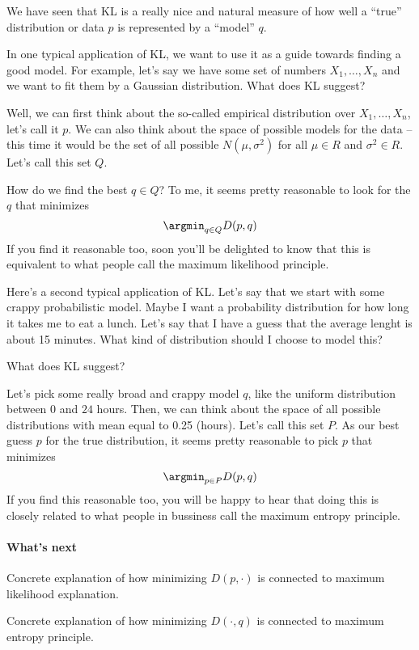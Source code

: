 \documentclass{article}
\begin{document}
We have seen that KL is a really nice and natural measure of how well a ``true'' distribution or data $p$ is represented by a ``model'' $q$. 

In one typical application of KL, we want to use it as a guide towards finding a good model. For example, let's say we have some set of numbers $X_1, \dots, X_n$ and we want to fit them by a Gaussian distribution. What does KL suggest? 

Well, we can first think about the so-called empirical distribution over $X_1, \dots, X_n$, let's call it $p$. 
We can also think about the space of possible models for the data -- this time it would be the set of all possible $N(\mu, \sigma^2)$ for all $\mu \in R$ and $\sigma^2 \in R$. Let's call this set $Q$. 

How do we find the best $q \in Q$? To me, it seems pretty reasonable to look for the $q$ that minimizes
\[
\argmin_{q\in Q} D(p, q)
\]
If you find it reasonable too, soon you'll be delighted to know that this is equivalent to what people call the maximum likelihood principle. 

Here's a second typical application of KL. Let's say that we start with some crappy probabilistic model. Maybe I want a probability distribution for how long it takes me to eat a lunch. Let's say that I have a guess that the average lenght is about 15 minutes. What kind of distribution should I choose to model this? 

What does KL suggest? 

Let's pick some really broad and crappy model $q$, like the uniform distribution between $0$ and $24$ hours. 
Then, we can think about the space of all possible distributions with mean equal to 0.25 (hours). Let's call this set $P$. As our best guess $p$ for the true distribution, it seems pretty reasonable to pick $p$ that minimizes
\[
\argmin_{p \in P} D(p,q)
\]
If you find this reasonable too, you will be happy to hear that doing this is closely related to what people in bussiness call the maximum entropy principle. 


\paragraph{What's next}

Concrete explanation of how minimizing $D(p, \cdot)$ is connected to maximum likelihood explanation. 

Concrete explanation of how minimizing $D(\cdot, q)$ is connected to maximum entropy principle. 
\end{document}
